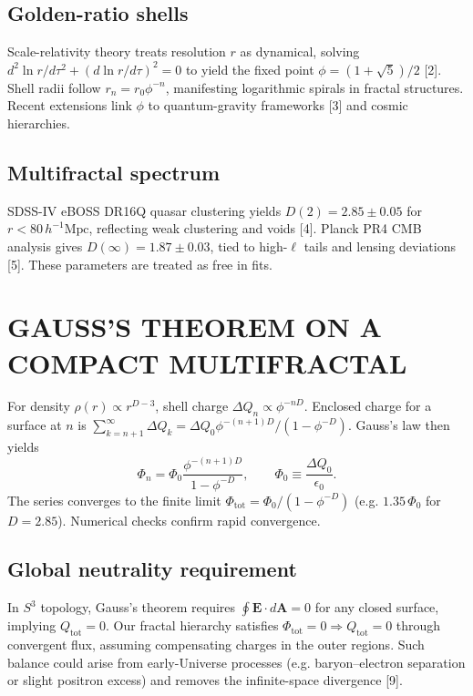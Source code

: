 \documentclass[10pt,twocolumn]{article}
\begin{document}
\subsection{Golden-ratio shells}

Scale-relativity theory treats resolution $r$ as dynamical, solving $d^2\ln r/d\tau^2 + (d\ln r/d\tau)^2=0$ to yield the fixed point $\phi=(1+\sqrt{5})/2$ [2]. Shell radii follow $r_n=r_0\phi^{-n}$, manifesting logarithmic spirals in fractal structures. Recent extensions link $\phi$ to quantum-gravity frameworks [3] and cosmic hierarchies.

\subsection{Multifractal spectrum}

SDSS-IV eBOSS DR16Q quasar clustering yields $D(2)=2.85\pm0.05$ for $r<80\,h^{-1}\mathrm{Mpc}$, reflecting weak clustering and voids [4]. Planck PR4 CMB analysis gives $D(\infty)=1.87\pm0.03$, tied to high-$\ell$ tails and lensing deviations [5]. These parameters are treated as free in fits.

\section{GAUSS'S THEOREM ON A COMPACT MULTIFRACTAL}

For density $\rho(r)\propto r^{D-3}$, shell charge $\Delta Q_n\propto\phi^{-nD}$. Enclosed charge for a surface at $n$ is $\sum_{k=n+1}^{\infty}\Delta Q_k = \Delta Q_0\phi^{-(n+1)D}/(1-\phi^{-D})$. Gauss's law then yields
\begin{equation}
\boxed{\Phi_n = \Phi_0\frac{\phi^{-(n+1)D}}{1-\phi^{-D}}}, \qquad \Phi_0 \equiv \frac{\Delta Q_0}{\epsilon_0}.
\end{equation}
The series converges to the finite limit $\Phi_{\mathrm{tot}}=\Phi_0/(1-\phi^{-D})$ (e.g. $1.35\,\Phi_0$ for $D=2.85$). Numerical checks confirm rapid convergence.

\subsection{Global neutrality requirement}

In $S^3$ topology, Gauss's theorem requires $\oint \mathbf{E}\cdot d\mathbf{A}=0$ for any closed surface, implying $Q_{\mathrm{tot}}=0$. Our fractal hierarchy satisfies $\Phi_{\mathrm{tot}}=0 \Longrightarrow Q_{\mathrm{tot}}=0$ through convergent flux, assuming compensating charges in the outer regions. Such balance could arise from early-Universe processes (e.g. baryon--electron separation or slight positron excess) and removes the infinite-space divergence [9].
\end{document}
